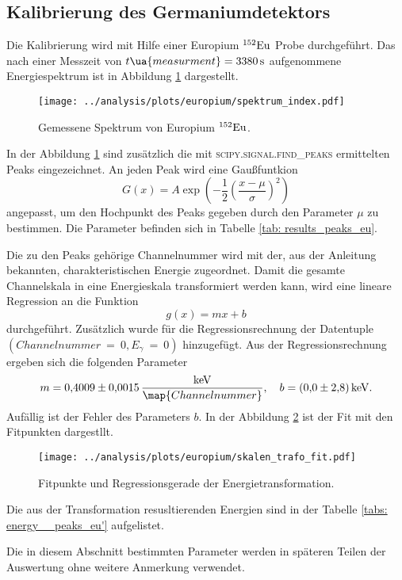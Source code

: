 \subsection{Kalibrierung des Germaniumdetektors}
Die Kalibrierung wird mit Hilfe einer Europium $^{152}\ce{Eu}$ Probe
durchgeführt. Das nach einer Messzeit von $t\ua{measurment}=\SI{3380}{\second}$
aufgenommene Energiespektrum ist in Abbildung \ref{fig:spectrum_europ} dargestellt.
\begin{figure}
  \centering
  \texttt{[image: ../analysis/plots/europium/spektrum\_index.pdf]}
  \caption{Gemessene Spektrum von Europium $^{152}\ce{Eu}$.}
  \label{fig:spectrum_europ}
\end{figure}
In der Abbildung \ref{fig:spectrum_europ} sind zusätzlich die mit
\textsc{scipy.signal.find\_{peaks}} ermittelten Peaks eingezeichnet.
An jeden Peak wird eine Gaußfuntkion
\begin{equation*}
  G(x)=A\exp{\left(-\frac{1}{2}\left(\frac{x-\mu}{\sigma}\right)^2\right)}
\end{equation*}
angepasst, um den Hochpunkt des Peaks gegeben durch den Parameter $\mu$ zu
bestimmen. Die Parameter befinden sich in Tabelle \ref{tab: results_peaks_eu}.

Die zu den Peaks gehörige Channelnummer wird mit der, aus der Anleitung \cite{anleitungV18}
bekannten, charakteristischen Energie zugeordnet.
Damit die gesamte Channelskala in eine Energieskala transformiert werden kann,
wird eine lineare Regression an die Funktion
\begin{equation*}
  g(x)=mx+b
\end{equation*}
durchgeführt. Zusätzlich wurde für die Regressionsrechnung der Datentuple\newline
$(Channelnummer~=~0,E_\gamma~=~0)$ hinzugefügt.
 Aus der Regressionsrechnung ergeben sich die folgenden Parameter
\begin{equation}
  \label{eq:channel_energie_trafo}
  m=\num{0.4009\pm0.0015}\,\frac{\si{\kilo\eV}}{\map{Channelnummer}}, \quad b=\SI{0.0\pm2.8}{\kilo\eV}.
\end{equation}
Aufällig ist der Fehler des Parameters $b$.
In der Abbildung \ref{fig:skalen_trafo_fit} ist der Fit mit den Fitpunkten dargestllt.
\begin{figure}
  \centering
  \texttt{[image: ../analysis/plots/europium/skalen\_trafo\_fit.pdf]}
  \caption{Fitpunkte und Regressionsgerade der Energietransformation.}
  \label{fig:skalen_trafo_fit}
\end{figure}
Die aus der Transformation resusltierenden Energien sind in der Tabelle \ref{tabs: energy__peaks_eu'}
aufgelistet.

Die in diesem Abschnitt bestimmten Parameter werden in späteren Teilen der Auswertung
ohne weitere Anmerkung verwendet.

